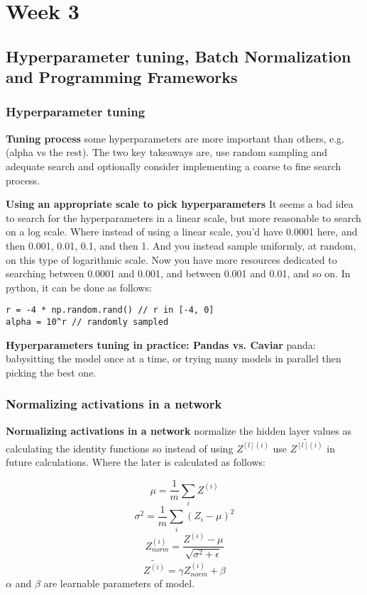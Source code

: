 \section*{Week 3}
\subsection*{Hyperparameter tuning, Batch Normalization and Programming Frameworks}

\subsubsection*{Hyperparameter tuning}
\textbf{Tuning process} some hyperparameters are more important than others, e.g. (alpha vs the rest). The two key takeaways are, use random sampling and adequate search and optionally consider implementing a coarse to fine search process.


\textbf{Using an appropriate scale to pick hyperparameters}
It seems a bad idea to search for the hyperparameters in a linear scale, but more reasonable to search on a log scale. Where instead of using a linear scale, you'd have 0.0001 here, and then 0.001, 0.01, 0.1, and then 1. And you instead sample uniformly, at random, on this type of logarithmic scale. Now you have more resources dedicated to searching between 0.0001 and 0.001, and between 0.001 and 0.01, and so on. 
In python, it can be done as follows:

\begin{lstlisting}
r = -4 * np.random.rand() // r in [-4, 0]
alpha = 10^r // randomly sampled 
\end{lstlisting}

\textbf{Hyperparameters tuning in practice: Pandas vs. Caviar} panda: babysitting the model once at a time, or trying many models in parallel then picking the best one.

\subsubsection*{Normalizing activations in a network}
\textbf{Normalizing activations in a network} normalize the hidden layer values as calculating the identity functions so instead of using $Z^{[l](i)}$ use $\tilde{Z^{[l](i)}}$ in future calculations. Where the later is calculated as follows:

\begin{equation*}
    \mu = \frac{1}{m} \sum_{i} Z^{(i)} 
\end{equation*}
\begin{equation*}
    \sigma^2 = \frac{1}{m} \sum_{i} (Z_{i} - \mu)^2 
\end{equation*}
\begin{equation*}
    Z^{(i)}_{norm} = \frac{Z^{(i)} - \mu}{\sqrt{\sigma^2 + \epsilon}}
\end{equation*}
\begin{equation*}
\tilde{Z^{(i)}} = \gamma Z^{(i)}_{norm} + \beta
\end{equation*}
$\alpha$ and $\beta$ are learnable parameters of model.

